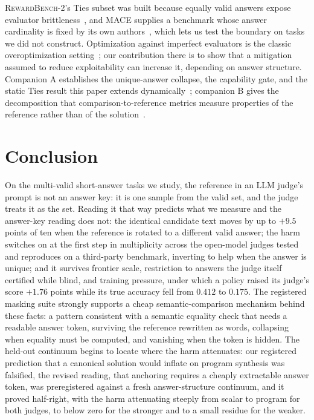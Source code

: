 \documentclass[11pt]{article}
\begin{document}
\textsc{RewardBench-2}'s Ties subset was built because equally valid answers expose evaluator brittleness~\cite{malik2025rewardbench2}, and \textsc{MACE} supplies a benchmark whose answer cardinality is fixed by its own authors~\cite{mace2026}, which lets us test the boundary on tasks we did not construct.
Optimization against imperfect evaluators is the classic overoptimization setting~\cite{gao2022scaling}; our contribution there is to show that a mitigation assumed to reduce exploitability can increase it, depending on answer structure.
Companion A establishes the unique-answer collapse, the capability gate, and the static Ties result this paper extends dynamically~\cite{companionA}; companion B gives the decomposition that comparison-to-reference metrics measure properties of the reference rather than of the solution~\cite{companionB}.

\section{Conclusion}

On the multi-valid short-answer tasks we study, the reference in an LLM judge's prompt is not an answer key: it is one sample from the valid set, and the judge treats it as the set.
Reading it that way predicts what we measure and the answer-key reading does not: the identical candidate text moves by up to $+9.5$ points of ten when the reference is rotated to a different valid answer; the harm switches on at the first step in multiplicity across the open-model judges tested and reproduces on a third-party benchmark, inverting to help when the answer is unique; and it survives frontier scale, restriction to answers the judge itself certified while blind, and training pressure, under which a policy raised its judge's score $+1.76$ points while its true accuracy fell from $0.412$ to $0.175$.
The registered masking suite strongly supports a cheap semantic-comparison mechanism behind these facts: a pattern consistent with a semantic equality check that needs a readable answer token, surviving the reference rewritten as words, collapsing when equality must be computed, and vanishing when the token is hidden.
The held-out continuum begins to locate where the harm attenuates: our registered prediction that a canonical solution would inflate on program synthesis was falsified, the revised reading, that anchoring requires a cheaply extractable answer token, was preregistered against a fresh answer-structure continuum, and it proved half-right, with the harm attenuating steeply from scalar to program for both judges, to below zero for the stronger and to a small residue for the weaker.
\end{document}
